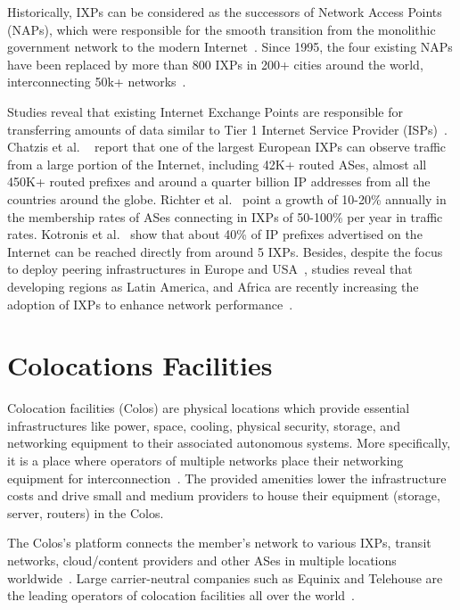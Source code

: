 	Historically, IXPs can be considered as the successors of Network Access Points (NAPs), which were responsible for the smooth transition from the monolithic government network to the modern Internet~\cite{Chatzis:2013}. Since 1995, the four existing NAPs have been replaced by more than 800 IXPs in 200+ cities around the world, interconnecting 50k+ networks~\cite{Ager:2012, Giotsas:2015:MPI:2716281.2836122}.

	Studies reveal that existing Internet Exchange Points are responsible for transferring amounts of data similar to Tier 1 Internet Service Provider (ISPs)~\cite{Ager:2012}. Chatzis et al. ~\cite{Chatzis:2013:BUL:2504730.2504746} report that one of the largest European IXPs can observe traffic from a large portion of the Internet, including 42K+ routed ASes, almost all 450K+ routed prefixes and around a quarter billion IP addresses from all the countries around the globe. Richter et al.~\cite{Richter:2014} point a growth of 10-20\% annually in the membership rates of ASes connecting in IXPs of 50-100\% per year in traffic rates. Kotronis et al.~\cite{Kotronis:2015:IPI:2745844.2745877} show that about 40\% of IP prefixes advertised on the Internet can be reached directly from around 5 IXPs. Besides, despite the focus to deploy peering infrastructures in Europe and USA~\cite{Chatzis:2013, Chatzis:2015:QVO:2717646.2717650}, studies reveal that developing regions as Latin America, and Africa are recently increasing the adoption of IXPs to enhance network performance~\cite{DissectingBrazilianIXP, Fanou:2017:ICC:3131365.3131394}.


	\section{Colocations Facilities}
	\label{subsec:colos}

	Colocation facilities (Colos) are physical locations which provide essential infrastructures like power, space, cooling, physical security, storage, and networking equipment to their associated autonomous systems. More specifically, it is a place where operators of multiple networks place their networking equipment for interconnection~\cite{BITAG}. The provided amenities lower the infrastructure costs and drive small and medium providers to house their equipment (storage, server, routers) in the Colos.

	The Colos's platform connects the member's network to various IXPs, transit networks, cloud/content providers and other ASes in multiple locations worldwide~\cite{Giotsas:2015:MPI:2716281.2836122}. Large carrier-neutral companies such as Equinix and Telehouse are the leading operators of colocation facilities all over the world~\cite{Kotronis:2017:STC:3131365.3131388}.

	


	